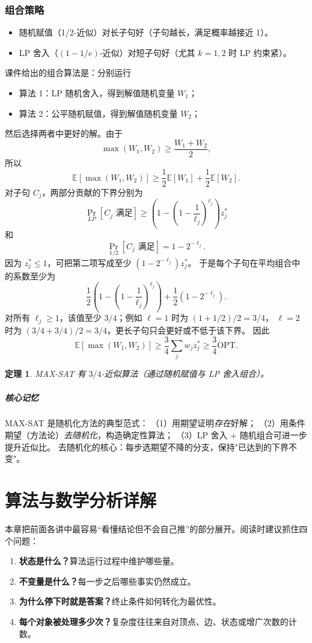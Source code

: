 \documentclass[UTF8,openany,12pt]{ctexbook}
\newtheorem{theorem}{定理}[chapter]
\theoremstyle{remark}
\newcommand{\keypoint}[1]{\paragraph{核心记忆}#1}
\newcommand{\OPT}{\mathrm{OPT}}
\begin{document}
\subsection{组合策略}

\begin{itemize}
  \item 随机赋值（1/2-近似）对长子句好（子句越长，满足概率越接近 1）。
  \item LP 舍入（$(1-1/e)$-近似）对短子句好（尤其 $k=1,2$ 时 LP 约束紧）。
\end{itemize}

课件给出的组合算法是：分别运行
\begin{itemize}
  \item 算法 1：LP 随机舍入，得到解值随机变量 $W_1$；
  \item 算法 2：公平随机赋值，得到解值随机变量 $W_2$；
\end{itemize}
然后选择两者中更好的解。由于
\[
  \max(W_1,W_2)\ge \frac{W_1+W_2}{2},
\]
所以
\[
  \mathbb E[\max(W_1,W_2)]
  \ge \frac12\mathbb E[W_1]+\frac12\mathbb E[W_2].
\]
对子句 $C_j$，两部分贡献的下界分别为
\[
  \Pr_{LP}[C_j\text{ 满足}]
  \ge
  \left(1-\left(1-\frac1{\ell_j}\right)^{\ell_j}\right)z_j^*
\]
和
\[
  \Pr_{1/2}[C_j\text{ 满足}]=1-2^{-\ell_j}.
\]
因为 $z_j^*\le1$，可把第二项写成至少 $(1-2^{-\ell_j})z_j^*$。
于是每个子句在平均组合中的系数至少为
\[
  \frac12\left(1-\left(1-\frac1{\ell_j}\right)^{\ell_j}\right)
  +\frac12(1-2^{-\ell_j}).
\]
对所有 $\ell_j\ge1$，该值至少 $3/4$；例如 $\ell=1$ 时为 $(1+1/2)/2=3/4$，
$\ell=2$ 时为 $(3/4+3/4)/2=3/4$，更长子句只会更好或不低于该下界。
因此
\[
  \mathbb E[\max(W_1,W_2)]\ge \frac34\sum_j w_jz_j^*
  \ge \frac34\OPT.
\]

\begin{theorem}
MAX-SAT 有 $3/4$-近似算法（通过随机赋值与 LP 舍入组合）。
\end{theorem}

\keypoint{
  MAX-SAT 是随机化方法的典型范式：
  （1）用期望证明\emph{存在}好解；
  （2）用条件期望（方法论）\emph{去随机化}，构造确定性算法；
  （3）LP 舍入 + 随机组合可进一步提升近似比。
  去随机化的核心：每步选期望不降的分支，保持"已达到的下界不变"。
}

\chapter{算法与数学分析详解}

本章把前面各讲中最容易“看懂结论但不会自己推”的部分展开。阅读时建议抓住四个问题：
\begin{enumerate}
  \item \textbf{状态是什么？}算法运行过程中维护哪些量。
  \item \textbf{不变量是什么？}每一步之后哪些事实仍然成立。
  \item \textbf{为什么停下时就是答案？}终止条件如何转化为最优性。
  \item \textbf{每个对象被处理多少次？}复杂度往往来自对顶点、边、状态或增广次数的计数。
\end{enumerate}
\end{document}

